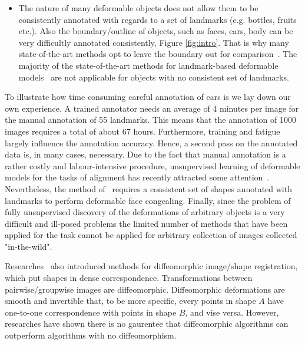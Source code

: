 \begin{itemize}
\item The nature of many deformable objects does not allow them to be consistently annotated with regards to a set of landmarks (e.g. bottles, fruits etc.). Also the boundary/outline of objects, such as faces, ears, body can be very difficultly annotated consistently, Figure \ref{fig:intro}. That is why many state-of-the-art methods opt to leave the boundary out for comparison~\cite{Tzimiropoulos2014, Asthana2014}. The majority of the state-of-the-art methods for landmark-based deformable models~\cite{Cao2012, Zhu2012, Xiong2013, Tzimiropoulos2014, Asthana2014} are not applicable for objects with no consistent set of landmarks. 

\end{itemize}

To illustrate how time consuming careful annotation of ears is we lay down our own experience. A trained annotator needs an average of 4 minutes per image for the manual annotation of 55 landmarks. This means that the annotation of 1000 images requires a total of about 67 hours. 
Furthermore, training and fatigue largely influence the annotation accuracy. Hence, a second pass on the annotated data is, in many cases, necessary. Due to the fact that manual annotation is a rather costly and labour-intensive procedure, unsupervised learning of deformable models for the tasks of alignment has recently attracted some attention~\cite{kokkinos2007unsupervised,jojic2006escaping,jiang2009learning,liu2009simultaneous,baker2004automatic,cox2008least,cootes2004groupwise,frey2003learning}. Nevertheless, the method of~\cite{antonakos2014automatic} requires a consistent set of shapes annotated with landmarks to perform deformable face congealing. Finally, since the problem of fully unsupervised discovery of the deformations of arbitrary objects is a very difficult and ill-posed problems the limited number of methods that have been applied for the task cannot be applied for arbitrary collection of images collected "in-the-wild". 

Researches~\cite{cootes2004groupwise,cootes2004diffeomorphic,cootes2010computing,rueckert2006diffeomorphic,rueckert1999nonrigid,koelstra2010dynamic} also introduced methods for diffeomorphic image/shape registration, which put shapes in dense correspondence. Transformations between pairwise/groupwise images are diffeomorphic. Diffeomorphic deformations are smooth and invertible that, to be more specific, every points in shape $A$ have one-to-one correspondence with points in shape $B$, and vise versa. However, researches have shown there is no gaurentee that diffeomorphic algorithms can outperform algorithms with no diffeomorphism\cite{crum2004framework}.

